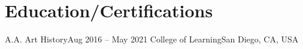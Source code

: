 \section{Education/Certifications}
\mySubHeadingListStart

  \mySubHeading
    {A.A. Art History}{Aug 2016 -- May 2021}
    {College of Learning}{San Diego, CA, USA}
    \myItemListStart
    \myItemListEnd

\mySubHeadingListEnd

